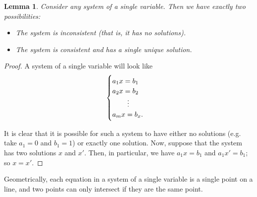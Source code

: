 \documentclass[a4paper,leqno]{article}
\numberwithin{equation}{section}
\newtheorem{lem}[equation]{Lemma}
\theoremstyle{definition}
\theoremstyle{remark}
\begin{document}
\begin{lem}
  Consider any system of a single variable. Then we have exactly two possibilities:
  \begin{itemize}
    \item The system is inconsistent (that is, it has no solutions).
    \item The system is consistent and has a single unique solution.
  \end{itemize}
\end{lem}
\begin{proof}
  A system of a single variable will look like
  \begin{equation}
    \begin{cases}
      a_1 x = b_1\\
      a_2 x = b_2\\
        \hspace{0.15em}\qquad\vdots\\
      a_m x = b_x.
    \end{cases}
  \end{equation}

  It is clear that it is possible for such a system to have either no solutions (e.g. take $ a_1 = 0 $ and $ b_1 = 1 $) or exactly one solution. Now,
  suppose that the system has two solutions $ x $ and $ x' $. Then, in particular, we have $ a_1 x = b_1 $ and $ a_1 x' = b_1 $; so $ x = x' $.
\end{proof}

Geometrically, each equation in a system of a single variable is a single point on a line, and two points can only intersect if they
are the same point.
\end{document}
